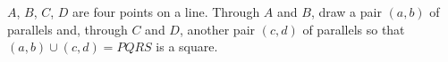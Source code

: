 $A$, $B$, $C$, $D$ are four points on a line. Through $A$ and $B$, draw a pair $(a, b)$ of parallels and, through $C$ and $D$, another pair $(c, d)$ of parallels so that $(a, b) \cup (c, d) = PQRS$ is a square.
